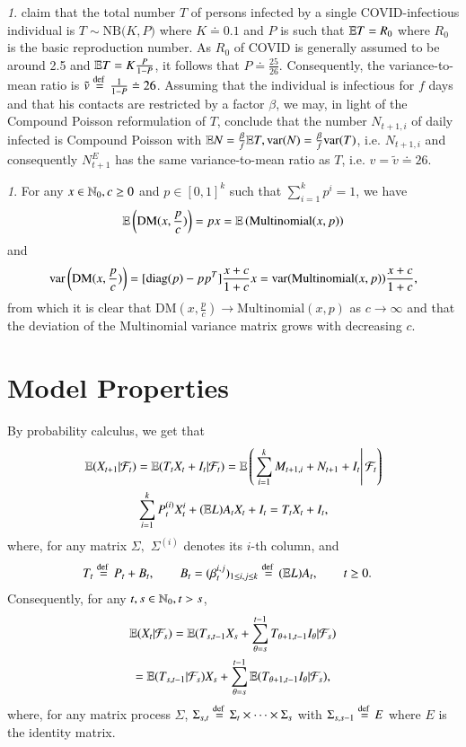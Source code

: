 \documentclass[english]{elsarticle}
\theoremstyle{plain}
\theoremstyle{remark}
\newtheorem{rem}[thm]{\protect\remarkname}
\theoremstyle{plain}
\theoremstyle{definition}
\providecommand{\remarkname}{Remark}
\begin{document}
\begin{rem}
\cite{endo2020estimating} claim that the total number $T$ of persons
infected by a single COVID-infectious individual is $T\sim\mathrm{NB}($$K,P)$
where $K\doteq0.1$ and $P$ is such that $\mathbb{E} T=R_{0}$ where $R_{0}$
is the basic reproduction number. As $R_{0}$ of COVID is generally
assumed to be around 2.5 and $\mathbb{E} T=K\frac{P}{1-P}$, it follows that
$P\doteq\frac{25}{26}$. Consequently, the variance-to-mean ratio
is $\tilde{v}\stackrel{\text{def }}{=}\frac{1}{1-P}\doteq26$. Assuming that the individual
is infectious for $f$ days and that his contacts are restricted by
a factor $\beta$, we may, in light of the Compound Poisson reformulation
of $T$, conclude that the number $N_{t+1,i}$ of daily infected is
Compound Poisson with $\mathbb{E} N=\frac{\beta}{f}\mathbb{E} T,\mathrm{var}(N)=\frac{\beta}{f}\mathrm{var}(T)$,
i.e. $N_{t+1,i}$ and consequently $N_{t+1}^{E}$ has the same variance-to-mean
ratio as $T$, i.e. $v=\tilde{v}\doteq26$. 
\end{rem}

\begin{rem}
For any $x\in\mathbb{N}_{0},c\geq0$ and $p\in[0,1]^{k}$ such that $\sum_{i=1}^{k}p^{i}=1$,
we have 
\[
\mathbb{E}\left(\mathrm{DM}(x,\frac{p}{c})\right)=px=\mathbb{E}\left(\mathrm{Multinomial}(x,p)\right)
\]
and 
\[
\mathrm{var}\left(\mathrm{DM}(x,\frac{p}{c})\right)=[\mathrm{diag}(p)-pp^{T}]\frac{x+c}{1+c}x=\mathrm{var}(\mathrm{Multinomial}(x,p))\frac{x+c}{1+c},
\]
from which it is clear that $\mathrm{DM}(x,\frac{p}{c})\rightarrow\mathrm{Multinomial}(x,p)$
as $c\rightarrow\infty$ and that the deviation of the Multinomial
variance matrix grows with decreasing $c$.
\end{rem}


\section{Model Properties}

\label{sec:Model-Properties}By probability calculus, we get that
\begin{multline*}
\mathbb{E}(X_{t+1}|\mathcal{F}_{t})=\mathbb{E}(T_{t}X_{t}+I_{t}|\mathcal{F}_{t})=\mathbb{E}\left(\left.\sum_{i=1}^{k}M_{t+1,i}+N_{t+1}+I_{t}\right|\mathcal{F}_{t}\right)\\
\sum_{i=1}^{k}P_{t}^{(i)}X_{t}^{i}+(\mathbb{E} L)A_{t}X_{t}+I_{t}=T_{t}X_{t}+I_{t},
\end{multline*}
where, for any matrix $\Sigma,$ $\Sigma^{(i)}$ denotes its $i$-th
column, and 
\begin{align}
T_{t} & \stackrel{\text{def }}{=} P_{t}+B_{t},\qquad B_{t}=(\beta_{t}^{i,j})_{1\leq i,j\leq k}\stackrel{\text{def }}{=}(\mathbb{E} L)A_{t},\qquad t\geq0.\label{eq:t}
\end{align}
Consequently, for any $t,s\in\mathbb{N}_{0},t>s$, 
\begin{multline*}
\mathbb{E}(X_{t}|\mathcal{F}_{s})=\mathbb{E}(T_{s,t-1}X_{s}+\sum_{\theta=s}^{t-1}T_{\theta+1,t-1}I_{\theta}|\mathcal{F}_{s})\\
=\mathbb{E}(T_{s,t-1}|\mathcal{F}_{s})X_{s}+\sum_{\theta=s}^{t-1}\mathbb{E}(T_{\theta+1,t-1}I_{\theta}|\mathcal{F}_{s}),
\end{multline*}
where, for any matrix process $\Sigma$, $\Sigma_{s,t}\stackrel{\text{def }}{=}\Sigma_{t}\times\dots\times\Sigma_{s}$
with $\Sigma_{s,s-1}\stackrel{\text{def }}{=} E$ where $E$ is the identity matrix.
\end{document}
